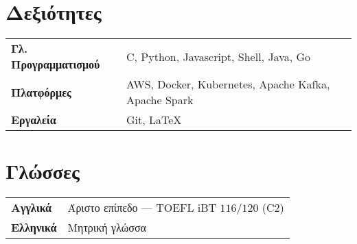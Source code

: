 \documentclass[margin, 10pt]{resume}
\newcommand{\sectionVSpace}{\vspace{-3.5ex}} %
\newcommand{\rSection}[1]{\sectionVSpace\section{#1}\xspace}
\newcommand{\project}[2]{\textbf{\href{#2}{#1}}}
\begin{document}
\begin{resume}
    \rSection{Δεξιότητες}

    \begin{tabular}{@{} >{\bfseries}l l @{}}
        Γλ. Προγραμματισμού & C, Python, Javascript, Shell, Java, Go              \\
        Πλατφόρμες          & AWS, Docker, Kubernetes, Apache Kafka, Apache Spark \\
        Εργαλεία            & Git, LaTeX
    \end{tabular}

    \vspace{1ex}

    \section{Γλώσσες}

    \begin{tabular}{@{} >{\bfseries}l l @{}}
        Αγγλικά  & Άριστο επίπεδο --- TOEFL iBT \( 116/120 \) (C2) \\
        Ελληνικά & Μητρική γλώσσα                                  \\
    \end{tabular}







\end{resume}
\end{document}
